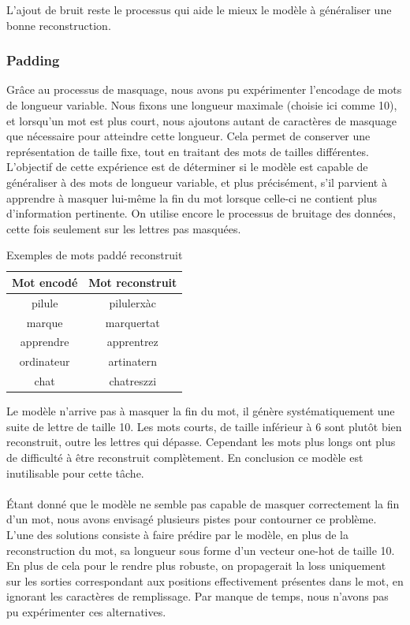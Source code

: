 \documentclass{article}
\begin{document}
L'ajout de bruit reste le processus qui aide le mieux le modèle à généraliser une bonne reconstruction.


\subsubsection{Padding}

Grâce au processus de masquage, nous avons pu expérimenter l’encodage de mots de longueur variable. Nous fixons une longueur maximale (choisie ici comme 10), et lorsqu’un mot est plus court, nous ajoutons autant de caractères de masquage que nécessaire pour atteindre cette longueur. Cela permet de conserver une représentation de taille fixe, tout en traitant des mots de tailles différentes. L’objectif de cette expérience est de déterminer si le modèle est capable de généraliser à des mots de longueur variable, et plus précisément, s’il parvient à apprendre à masquer lui-même la fin du mot lorsque celle-ci ne contient plus d’information pertinente. On utilise encore le processus de bruitage des données, cette fois seulement sur les lettres pas masquées.


\begin{table}[H]
\centering
\begin{tabular}{cc}
\hline
\textbf{Mot encodé} & \textbf{Mot reconstruit}\\
\hline
pilule & pilulerxàc \\
marque & marquertat \\
apprendre & apprentrez \\
ordinateur & artinatern \\
chat & chatreszzi \\
\hline
\end{tabular}
\caption{Exemples de mots paddé reconstruit}
\end{table}

Le modèle n'arrive pas à masquer la fin du mot, il génère systématiquement une suite de lettre de taille 10. Les mots courts, de taille inférieur à 6 sont plutôt bien reconstruit, outre les lettres qui dépasse. Cependant les mots plus longs ont plus de difficulté à être reconstruit complètement. En conclusion ce modèle est inutilisable pour cette tâche. 
\\ \\
Étant donné que le modèle ne semble pas capable de masquer correctement la fin d’un mot, nous avons envisagé plusieurs pistes pour contourner ce problème. L’une des solutions consiste à faire prédire par le modèle, en plus de la reconstruction du mot, sa longueur sous forme d’un vecteur one-hot de taille 10. En plus de cela pour le rendre plus robuste, on propagerait la loss uniquement sur les sorties correspondant aux positions effectivement présentes dans le mot, en ignorant les caractères de remplissage.  
Par manque de temps, nous n’avons pas pu expérimenter ces alternatives.
\end{document}
